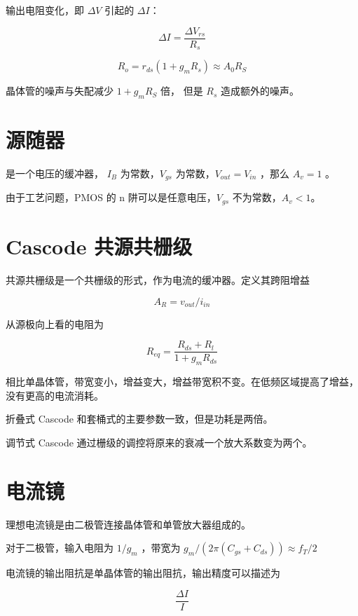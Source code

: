 \documentclass[cn,11pt,chinese,black,simple]{../elegantbook}
\begin{document}

输出电阻变化，即 \(\Delta V\) 引起的 \(\Delta I\)：

\[\Delta I = \frac{\Delta V_{rs}}{R_s}\]

\[R_o = r_{ds} (1 + g_m R_s) \approx A_0 R_S\] 

晶体管的噪声与失配减少 \(1 + g_m R_S\) 倍， 但是 \(R_s\) 造成额外的噪声。

\section{源随器}

是一个电压的缓冲器， \(I_B\) 为常数，\(V_{gs}\) 为常数，\(V_{out} = V_{in} \) ，那么 \(A_v = 1\) 。

由于工艺问题，PMOS 的 n 阱可以是任意电压，\(V_{gs}\) 不为常数，\(A_v < 1\)。

\section{Cascode 共源共栅级}

共源共栅级是一个共栅级的形式，作为电流的缓冲器。定义其跨阻增益

\[A_R = v_{out} / i_{in}\]

从源极向上看的电阻为 

\[R_{eq} = \frac{R_{ds} + R_l}{1 + g_m R_{ds}}\]

相比单晶体管，带宽变小，增益变大，增益带宽积不变。在低频区域提高了增益，没有更高的电流消耗。

折叠式 Cascode 和套桶式的主要参数一致，但是功耗是两倍。

调节式 Cascode 通过栅级的调控将原来的衰减一个放大系数变为两个。

\section{电流镜}

理想电流镜是由二极管连接晶体管和单管放大器组成的。

对于二极管，输入电阻为 \(1/g_m\) ，带宽为 \(g_m / (2 \pi (C_{gs} + C_{ds})) \approx f_T / 2\)

电流镜的输出阻抗是单晶体管的输出阻抗，输出精度可以描述为 

\[\frac{\Delta I}{I}\]




\let\chapname\undefined
\ifx\mainclass\undefined
\end{document}
